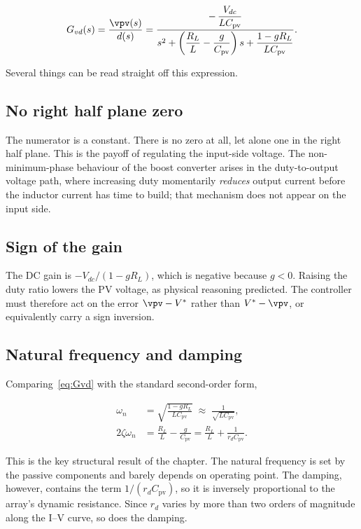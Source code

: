 \begin{equation}
G_{vd}(s) = \frac{\vpv(s)}{d(s)}
= \frac{-\,\dfrac{V_{dc}}{L C_{\mathrm{pv}}}}
       {s^2 + \left(\dfrac{R_L}{L} - \dfrac{g}{C_{\mathrm{pv}}}\right)s
        + \dfrac{1 - g R_L}{L C_{\mathrm{pv}}}} .
\label{eq:Gvd}
\end{equation}

Several things can be read straight off this expression.

\subsection{No right half plane zero}

The numerator is a constant. There is no zero at all, let alone one in the right
half plane. This is the payoff of regulating the input-side voltage. The
non-minimum-phase behaviour of the boost converter arises in the duty-to-output
voltage path, where increasing duty momentarily \emph{reduces} output current
before the inductor current has time to build; that mechanism does not appear on
the input side.

\subsection{Sign of the gain}

The DC gain is $-V_{dc}/(1 - g R_L)$, which is negative because $g < 0$. Raising
the duty ratio lowers the PV voltage, as physical reasoning predicted. The
controller must therefore act on the error $\vpv - V^\ast$ rather than
$V^\ast - \vpv$, or equivalently carry a sign inversion.

\subsection{Natural frequency and damping}

Comparing~\eqref{eq:Gvd} with the standard second-order form,

\begin{align}
\omega_n &= \sqrt{\frac{1 - g R_L}{L C_{\mathrm{pv}}}} \;\approx\; \frac{1}{\sqrt{L C_{\mathrm{pv}}}}, \label{eq:wn}\\
2\zeta\omega_n &= \frac{R_L}{L} - \frac{g}{C_{\mathrm{pv}}} = \frac{R_L}{L} + \frac{1}{r_d C_{\mathrm{pv}}}. \label{eq:zeta}
\end{align}

This is the key structural result of the chapter. The natural frequency is set
by the passive components and barely depends on operating point. The damping,
however, contains the term $1/(r_d C_{\mathrm{pv}})$, so it is inversely
proportional to the array's dynamic resistance. Since $r_d$ varies by more than
two orders of magnitude along the I--V curve, so does the damping.

